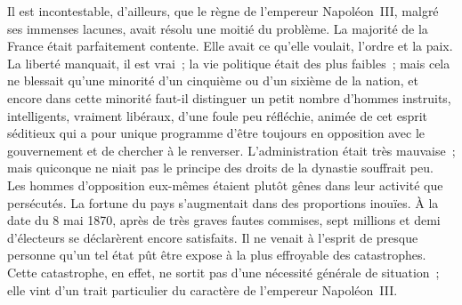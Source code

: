 \documentclass[french,twoside]{book} %
\begin{document}
Il est incontestable, d’ailleurs, que le règne de l’empereur Napoléon III, malgré ses immenses lacunes, avait résolu une moitié du problème. La majorité de la France était parfaitement contente. Elle avait ce qu’elle voulait, l’ordre et la paix. La liberté manquait, il est vrai ; la vie politique était des plus faibles ; mais cela ne blessait qu’une minorité d’un cinquième ou d’un sixième de la nation, et encore dans cette minorité faut-il distinguer un petit nombre d’hommes instruits, intelligents, vraiment libéraux, d’une foule peu réfléchie, animée de cet esprit séditieux qui a pour unique programme d’être toujours en opposition avec le gouvernement et de chercher à le renverser. L’administration était très mauvaise ; mais quiconque ne niait pas le principe des droits de la dynastie souffrait peu. Les hommes d’opposition eux-mêmes étaient plutôt gênes dans leur activité que persécutés. La fortune du pays s’augmentait dans des proportions inouïes. À la date du 8 mai 1870, après de très graves fautes commises, sept millions et demi d’électeurs se déclarèrent encore satisfaits. Il ne venait à l’esprit de presque personne qu’un tel état pût être expose à la plus effroyable des catastrophes. Cette catastrophe, en effet, ne sortit pas d’une nécessité générale de situation ; elle vint d’un trait particulier du caractère de l’empereur Napoléon III.
\end{document}
